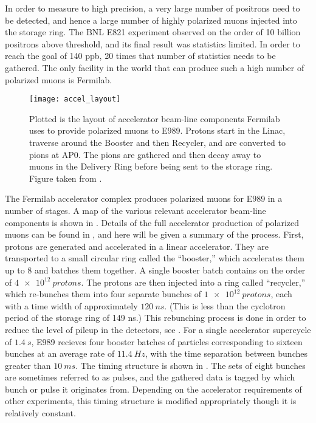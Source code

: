In order to measure \gmtwo to high precision, a very large number of positrons need to be detected, and hence a large number of highly polarized muons injected into the storage ring. The BNL E821 experiment observed on the order of 10 billion positrons above threshold, and its final result was statistics limited. In order to reach the goal of 140 ppb, 20 times that number of statistics needs to be gathered. The only facility in the world that can produce such a high number of polarized muons is Fermilab. 

\begin{figure}[]
    \centering
    \texttt{[image: accel\_layout]}
    \caption[Fermilab accelerator layout for muon delivery to E989]{Plotted is the layout of accelerator beam-line components Fermilab uses to provide polarized muons to E989. Protons start in the Linac, traverse around the Booster and then Recycler, and are converted to pions at AP0. The pions are gathered and then decay away to muons in the Delivery Ring before being sent to the \gmtwo storage ring. Figure taken from .}   
    \label{fig:accelerator}
\end{figure}

The Fermilab accelerator complex produces polarized muons for E989 in a number of stages. A map of the various relevant accelerator beam-line components is shown in . Details of the full accelerator production of polarized muons can be found in , and here will be given a summary of the process. First, protons are generated and accelerated in a linear accelerator. They are transported to a small circular ring called the ``booster,'' which accelerates them up to 8 \GeV and batches them together. A single booster batch contains on the order of $\SI{4e12}{protons}$. The protons are then injected into a ring called ``recycler,'' which re-bunches them into four separate bunches of $\SI{1e12}{protons}$, each with a time width of approximately $\SI{120}{ns}$. (This is less than the cyclotron period of the storage ring of 149 ns.) This rebunching process is done in order to reduce the level of pileup in the \gmtwo detectors, see . For a single accelerator supercycle of $\SI{1.4}{s}$, E989 recieves four booster batches of particles corresponding to sixteen bunches at an average rate of $\SI{11.4}{Hz}$, with the time separation between bunches greater than $\SI{10}{ms}$. The timing structure is shown in . The sets of eight bunches are sometimes referred to as pulses, and the gathered data is tagged by which bunch or pulse it originates from. Depending on the accelerator requirements of other experiments, this timing structure is modified appropriately though it is relatively constant.


